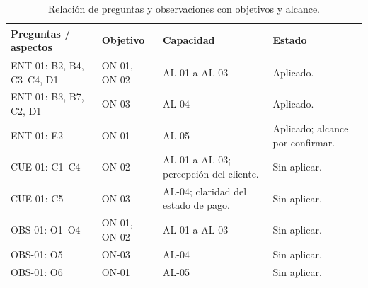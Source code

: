 \begin{table}[H]\centering\small
\caption{Relación de preguntas y observaciones con objetivos y alcance.}\label{tab:traza-instrumentos}
\noindent\begin{tabularx}{\linewidth}{@{}L{3.7cm}L{2.6cm}YL{2.4cm}@{}}
\toprule
\textbf{Preguntas / aspectos} & \textbf{Objetivo} & \textbf{Capacidad} & \textbf{Estado} \\
\midrule
ENT-01: B2, B4, C3--C4, D1 & ON-01, ON-02 & AL-01 a AL-03 & Aplicado. \\
ENT-01: B3, B7, C2, D1 & ON-03 & AL-04 & Aplicado. \\
ENT-01: E2 & ON-01 & AL-05 & Aplicado; alcance por confirmar. \\
CUE-01: C1--C4 & ON-02 & AL-01 a AL-03; percepción del cliente. & Sin aplicar. \\
CUE-01: C5 & ON-03 & AL-04; claridad del estado de pago. & Sin aplicar. \\
OBS-01: O1--O4 & ON-01, ON-02 & AL-01 a AL-03 & Sin aplicar. \\
OBS-01: O5 & ON-03 & AL-04 & Sin aplicar. \\
OBS-01: O6 & ON-01 & AL-05 & Sin aplicar. \\
\bottomrule
\end{tabularx}
\end{table}
